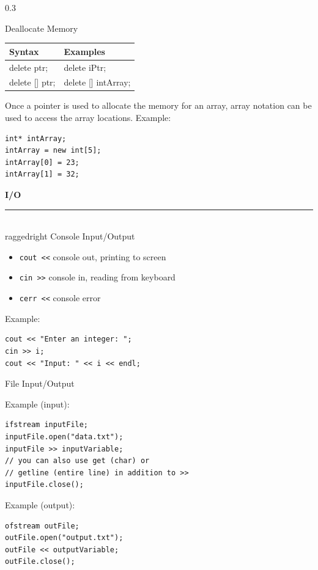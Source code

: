 \documentclass[final]{beamer}
\renewcommand{\section}[1]{%
  \par\vspace{1em}%
  {\noindent\usebeamerfont{section title}\Large\bfseries #1\par}%
  \vspace{0.5em}\hrule\vspace{1em}%
}
\begin{document}
\begin{frame}[t,fragile]
\begin{columns}[t,totalwidth=0.95\paperwidth, colsep=0.05\paperwidth]
\begin{column}{0.3\paperwidth}
\begin{block}{\raggedright Deallocate Memory}
\begin{tabular}{|l|l|}
\hline
\textbf{Syntax} & \textbf{Examples} \\
\hline
delete ptr; & delete iPtr; \\
\hline
delete [] ptr; & delete [] intArray; \\
\hline
\end{tabular}

Once a pointer is used to allocate the memory for an array, array notation can be used to access the array locations.
Example:
\begin{lstlisting}
int* intArray;
intArray = new int[5];
intArray[0] = 23;
intArray[1] = 32;
\end{lstlisting}
\end{block}
\section{I/O}
\begin{block}{\\raggedright Console Input/Output}
\begin{itemize}
    \item \texttt{cout <<} console out, printing to screen
    \item \texttt{cin >>} console in, reading from keyboard
    \item \texttt{cerr <<} console error
\end{itemize}
Example:
\begin{lstlisting}
cout << "Enter an integer: ";
cin >> i;
cout << "Input: " << i << endl;
\end{lstlisting}
\end{block}

\begin{block}{\raggedright File Input/Output}
Example (input):
\begin{lstlisting}
ifstream inputFile;
inputFile.open("data.txt");
inputFile >> inputVariable;
// you can also use get (char) or
// getline (entire line) in addition to >>
inputFile.close();
\end{lstlisting}
Example (output):
\begin{lstlisting}
ofstream outFile;
outFile.open("output.txt");
outFile << outputVariable;
outFile.close();
\end{lstlisting}
\end{block}

\end{column}
\end{columns}
\end{frame}
\end{document}

